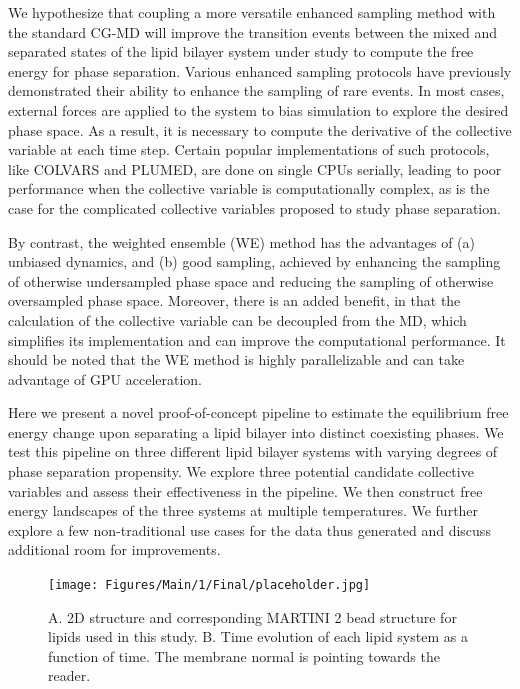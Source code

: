 \documentclass{biophys-new}
\begin{document}
We hypothesize that coupling a more versatile enhanced sampling method with the standard CG-MD will improve the transition events between the mixed and separated states of the lipid bilayer system under study to compute the free energy for phase separation.
Various enhanced sampling protocols have previously demonstrated their ability to enhance the sampling of rare events\cite{Henin2022}.
In most cases, external forces are applied to the system to bias simulation to explore the desired phase space.
As a result, it is necessary to compute the derivative of the collective variable at each time step.
Certain popular implementations of such protocols, like COLVARS\cite{Fiorin2013} and PLUMED\cite{Barducci2015}, are done on single CPUs serially, leading to poor performance when the collective variable is computationally complex, as is the case for the complicated collective variables proposed to study phase separation.

By contrast, the weighted ensemble (WE)\cite{Zuckerman2017} method has the advantages of (a) unbiased dynamics, and (b) good sampling, achieved by enhancing the sampling of otherwise undersampled phase space and reducing the sampling of otherwise oversampled phase space.
Moreover, there is an added benefit, in that the calculation of the collective variable can be decoupled from the MD, which simplifies its implementation and can improve the computational performance.
It should be noted that the WE method is highly parallelizable and can take advantage of GPU acceleration\cite{Zwier2015}.

Here we present a novel proof-of-concept pipeline to estimate the equilibrium free energy change upon separating a lipid bilayer into distinct coexisting phases.
We test this pipeline on three different lipid bilayer systems with varying degrees of phase separation propensity.
We explore three potential candidate collective variables and assess their effectiveness in the pipeline.
We then construct free energy landscapes of the three systems at multiple temperatures.
We further explore a few non-traditional use cases for the data thus generated and discuss additional room for improvements.

\begin{figure}[hbt!]
\centering
\texttt{[image: Figures/Main/1/Final/placeholder.jpg]}
\caption{A. 2D structure and corresponding MARTINI 2 bead structure for lipids used in this study. B. Time evolution of each lipid system as a function of time. The membrane normal is pointing towards the reader.}
\label{fig1:view}
\end{figure}
\end{document}
